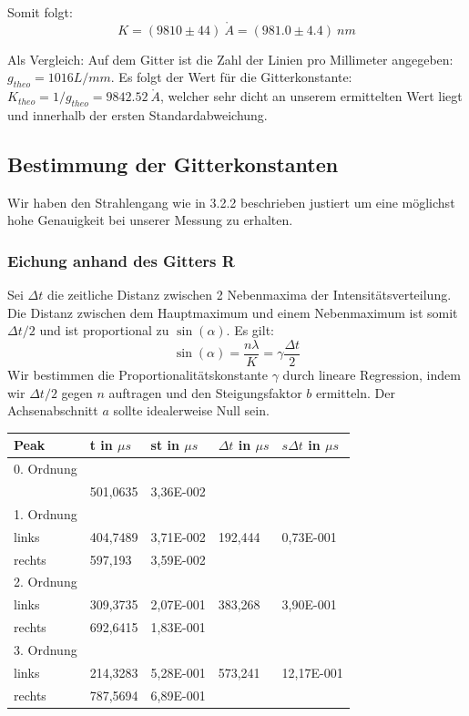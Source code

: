 Somit folgt: $$\boxed{K=(9810 \pm 44) \ \mathring A = (981.0 \pm 4.4) \ nm}$$

Als Vergleich: Auf dem Gitter ist die Zahl der Linien pro Millimeter angegeben: \\ $g_{theo}=1016 L/mm$. Es folgt der Wert f\"ur die Gitterkonstante: $K_{theo} = 1/g_{theo} = 9842.52 \ \mathring A$, welcher sehr dicht an unserem ermittelten Wert liegt und innerhalb der ersten Standardabweichung.

\subsection{Bestimmung der Gitterkonstanten}

Wir haben den Strahlengang wie in 3.2.2 beschrieben justiert um eine m\"oglichst hohe Genauigkeit bei unserer Messung zu erhalten.

\subsubsection{Eichung anhand des Gitters R}

Sei $\Delta t$ die zeitliche Distanz zwischen 2 Nebenmaxima der Intensit\"atsverteilung. Die Distanz zwischen dem Hauptmaximum und einem Nebenmaximum ist somit $\Delta t/2$ und ist proportional zu $\sin(\alpha)$. Es gilt: $$\sin(\alpha) = \frac{n\lambda}{K} = \gamma \frac{\Delta t}{2}$$
Wir bestimmen die Proportionalit\"atskonstante $\gamma$ durch lineare Regression, indem wir $\Delta t/2$ gegen $n$ auftragen und den Steigungsfaktor $b$ ermitteln. Der Achsenabschnitt $a$ sollte idealerweise Null sein.

\begin{center}
\begin{tabular}{lllll}
\toprule
Peak & t in $\mu s$ & st in $\mu s$ & $\Delta t$ in $\mu s$ & $s\Delta t$ in $\mu s$ \\
\midrule
0. Ordnung \\
 & 501,0635 & 3,36E-002\\
\midrule
1. Ordnung\\
links & 404,7489 & 3,71E-002 & 192,444 & 0,73E-001\\
rechts & 597,193 & 3,59E-002\\
\midrule
2. Ordnung\\ 
links & 309,3735 & 2,07E-001 & 383,268 & 3,90E-001\\
rechts & 692,6415 & 1,83E-001\\
\midrule
3. Ordnung\\ 
links & 214,3283 & 5,28E-001 & 573,241 & 12,17E-001\\
rechts & 787,5694 & 6,89E-001\\
\bottomrule
\end{tabular}
\end{center}

